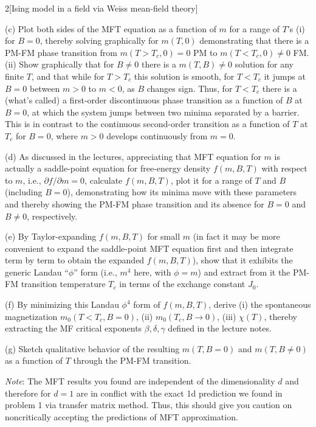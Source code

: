 \documentclass[12pt]{article}
\begin{document}
\begin{problem}{2}[Ising model in a field via Weiss mean-field theory]
\begin{solution}
\end{solution}

(c) Plot both sides of the MFT equation as a function of $m$ for a range of
$T$'s (i) for $B=0$, thereby solving graphically for $m(T,0)$ demonstrating that
there is a PM-FM phase transition from $m(T>T_c,0)=0$ PM to $m(T<T_c,0)\neq 0$
FM. (ii) Show graphically that for $B\neq 0 $ there is a $m(T,B)\neq 0$ solution
for any finite $T$, and that while for $T>T_c$ this solution is smooth, for
$T<T_c$ it jumps at $B=0$ between $m>0$ to $m<0$, as $B$ changes sign. Thus, for
$T<T_c$ there is a (what's called) a first-order discontinuous phase transition
as a function of $B$ at $B=0$, at which the system jumps between two minima
separated by a barrier. This is in contrast to the continuous second-order
transition as a function of $T$ at $T_c$ for $B=0$, where $m>0$ develops
continuously from $m=0$.

(d) As discussed in the lectures, appreciating that MFT equation for $m$ is
actually a saddle-point equation for free-energy density $f(m,B,T)$ with respect
to $m$, i.e., $\partial f/\partial m=0$, calculate $f(m,B,T)$, plot it for a
range of $T$ and $B$ (including $B=0$), demonstrating how its minima move with
these parameters and thereby showing the PM-FM phase transition and its absence
for $B=0$ and $B\neq 0$, respectively.

(e) By Taylor-expanding $f(m,B,T)$ for small $m$ (in fact it may be more
convenient to expand the saddle-point MFT equation first and then integrate term
by term to obtain the expanded $f(m,B,T)$), show that it exhibits the generic
Landau ``$\phi$'' form (i.e., $m^4$ here, with $\phi=m$) and extract from it the
PM-FM transition temperature $T_c$ in terms of the exchange constant $J_0$.

(f) By minimizing this Landau $\phi^4$ form of $f(m,B,T)$, derive (i) the
spontaneous magnetization $m_0(T<T_c,B=0)$, (ii) $m_0(T_c,B\to0)$, (iii)
$\chi(T)$, thereby extracting the MF critical exponents $\beta,\delta,\gamma$
defined in the lecture notes.

(g) Sketch qualitative behavior of the resulting $m(T,B=0)$ and $m(T,B\neq0)$ as
a function of $T$ through the PM-FM transition.

\textit{Note}: The MFT results you found are independent of the dimensionality
$d$ and therefore for $d=1$ are in conflict with the exact 1d prediction we
found in problem 1 via transfer matrix method. Thus, this should give you
caution on noncritically accepting the predictions of MFT approximation.
\begin{solution}
\end{solution}
\end{problem}
\end{document}
